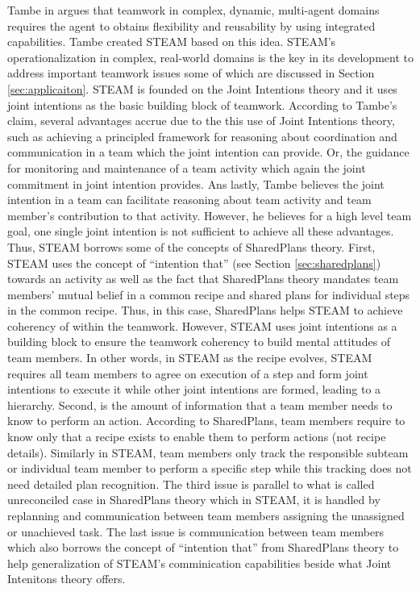 \documentclass[11pt]{article}
\begin{document}
Tambe in \cite{tambe:flexible-teamwork} argues that teamwork in complex,
dynamic, multi-agent domains requires the agent to obtains flexibility and
reusability by using integrated capabilities. Tambe created STEAM based on this
idea. STEAM's operationalization in complex, real-world domains is the key in
its development to address important teamwork issues some of which are discussed
in Section \ref{sec:applicaiton}. STEAM is founded on the Joint Intentions
theory and it uses joint intentions as the basic building block of teamwork.
According to Tambe's claim, several advantages accrue due to the this use of
Joint Intentions theory, such as achieving a principled framework for reasoning
about coordination and communication in a team which the joint intention can
provide. Or, the guidance for monitoring and maintenance of a team activity
which again the joint commitment in joint intention provides. Ans lastly, Tambe
believes the joint intention in a team can facilitate reasoning about team
activity and team member's contribution to that activity. However, he believes
for a high level team goal, one single joint intention is not sufficient to
achieve all these advantages. Thus, STEAM borrows some of the concepts of
SharedPlans theory. First, STEAM uses the concept of ``intention that'' (see
Section \ref{sec:sharedplans}) towards an activity as well as the fact that
SharedPlans theory mandates team members' mutual belief in a common recipe and
shared plans for individual steps in the common recipe. Thus, in this case,
SharedPlans helps STEAM to achieve coherency of within the teamwork. However,
STEAM uses joint intentions as a building block to ensure the teamwork coherency
to build mental attitudes of team members. In other words, in STEAM as the
recipe evolves, STEAM requires all team members to agree on execution of a step
and form joint intentions to execute it while other joint intentions are formed,
leading to a hierarchy. Second, is the amount of information that a team member
needs to know to perform an action. According to SharedPlans, team members
require to know only that a recipe exists to enable them to perform actions
(not recipe details). Similarly in STEAM, team members only track the
responsible subteam or individual team member to perform a specific step while
this tracking does not need detailed plan recognition. The third issue is
parallel to what is called unreconciled case in SharedPlans theory which in
STEAM, it is handled by replanning and communication between team members
assigning the unassigned or unachieved task. The last issue is communication
between team members which also borrows the concept of ``intention that'' from
SharedPlans theory to help generalization of STEAM's comminication capabilities 
beside what Joint Intenitons theory offers.
\end{document}
